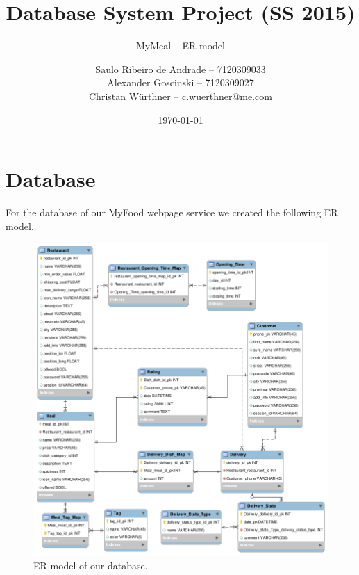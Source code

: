 \documentclass[parskip=half, a4paper, DIV=28]{scrartcl}
\begin{document}
\title{Database System Project (SS 2015)}
\subtitle{MyMeal -- ER model}
\author{Saulo Ribeiro de Andrade -- 7120309033\\
		Alexander Goscinski -- 7120309027\\
		Christan Würthner -- c.wuerthner@me.com}
\date{\today}
\maketitle

\section{Database}
For the database of our MyFood webpage service we created the following ER model. 
\begin{figure}[h!]
	\centering
		\includegraphics[scale=0.5]{er_model.png}
	\caption{ER model of our database.}
\end{figure}
\end{document}
